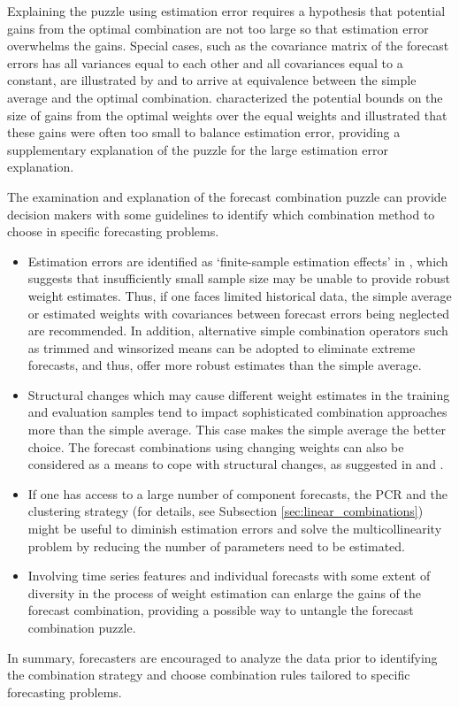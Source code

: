 \documentclass[11pt]{article}
\begin{document}
Explaining the puzzle using estimation error requires a hypothesis that potential gains from the optimal combination are not too large so that estimation error overwhelms the gains. Special cases, such as the covariance matrix of the forecast errors has all variances equal to each other and all covariances equal to a constant, are illustrated by \cite{Timmermann2006-en} and \cite{Hsiao2014-ug} to arrive at equivalence between the simple average and the optimal combination. \cite{Elliott2011-ab} characterized the potential bounds on the size of gains from the optimal weights over the equal weights and illustrated that these gains were often too small to balance estimation error, providing a supplementary explanation of the puzzle for the large estimation error explanation.

The examination and explanation of the forecast combination puzzle can provide decision makers with some guidelines to identify which combination method to choose in specific forecasting problems.
\begin{itemize}
  \item Estimation errors are identified as `finite-sample estimation effects' in \cite{Smith2009-wd}, which suggests that insufficiently small sample size may be unable to provide robust weight estimates. Thus, if one faces limited historical data, the simple average or estimated weights with covariances between forecast errors being neglected are recommended. In addition, alternative simple combination operators such as trimmed and winsorized means can be adopted to eliminate extreme forecasts, and thus, offer more robust estimates than the simple average.
  \item Structural changes which may cause different weight estimates in the training and evaluation samples tend to impact sophisticated combination approaches more than the simple average. This case makes the simple average the better choice. The forecast combinations using changing weights can also be considered as a means to cope with structural changes, as suggested in \cite{Diebold1987-go} and \cite{Deutsch1994-ob}.
  \item If one has access to a large number of component forecasts, the PCR and the clustering strategy (for details, see Subsection \ref{sec:linear_combinations}) might be useful to diminish estimation errors and solve the multicollinearity problem by reducing the number of parameters need to be estimated.
  \item Involving time series features and individual forecasts with some extent of diversity in the process of weight estimation can enlarge the gains of the forecast combination, providing a possible way to untangle the forecast combination puzzle.
\end{itemize}
In summary, forecasters are encouraged to analyze the data prior to identifying the combination strategy and choose combination rules tailored to specific forecasting problems.
\end{document}
